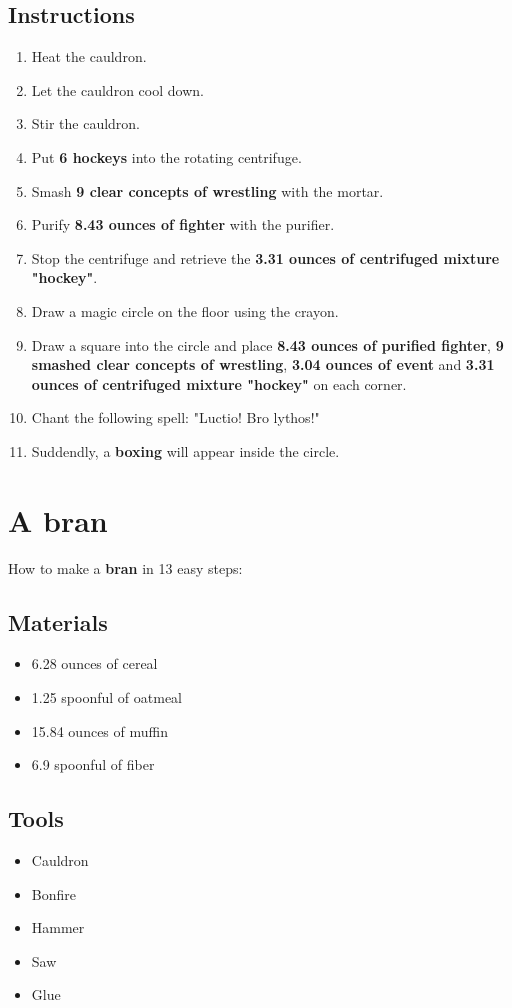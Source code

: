 \documentclass{article}
\begin{document}
\subsection{Instructions}\begin{enumerate}
\item 
Heat the cauldron.
\item 
Let the cauldron cool down.
\item 
Stir the cauldron.
\item 
Put \textbf{6 hockeys} into the rotating centrifuge.
\item 
Smash \textbf{9 clear concepts of wrestling} with the mortar.
\item 
Purify \textbf{8.43 ounces of fighter} with the purifier.
\item 
Stop the centrifuge and retrieve the \textbf{3.31 ounces of centrifuged mixture "hockey"}.
\item 
Draw a magic circle on the floor using the crayon.
\item 
Draw a square into the circle and place \textbf{8.43 ounces of purified fighter}, \textbf{9 smashed clear concepts of wrestling}, \textbf{3.04 ounces of event} and \textbf{3.31 ounces of centrifuged mixture "hockey"} on each corner.
\item 
Chant the following spell: "Luctio! Bro lythos!"
\item 
Suddendly, a \textbf{boxing} will appear inside the circle.
\end{enumerate}
\newpage
\section{A bran}How to make a \textbf{bran} in 13 easy steps:

\subsection{Materials}\begin{itemize}
\item 
6.28 ounces of cereal
\item 
1.25 spoonful of oatmeal
\item 
15.84 ounces of muffin
\item 
6.9 spoonful of fiber
\end{itemize}
\subsection{Tools}\begin{itemize}
\item 
Cauldron
\item 
Bonfire
\item 
Hammer
\item 
Saw
\item 
Glue
\end{itemize}
\end{document}
